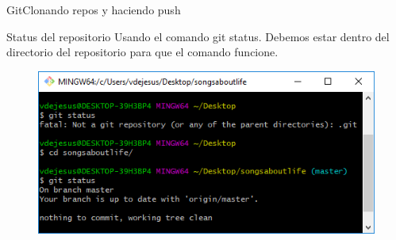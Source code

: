 \documentclass[10pt]{beamer}
\begin{document}
\begin{frame}{Git}{Clonando repos y haciendo push}

\begin{block}{Status del repositorio}
Usando el comando git status. Debemos estar dentro del directorio del repositorio para que el comando funcione.

\begin{figure}[h!]
\centering
\includegraphics [scale=0.5]{gitstatus}
\label{fig:gitstatus}
\end{figure}

\end{block}

\end{frame}
\end{document}
